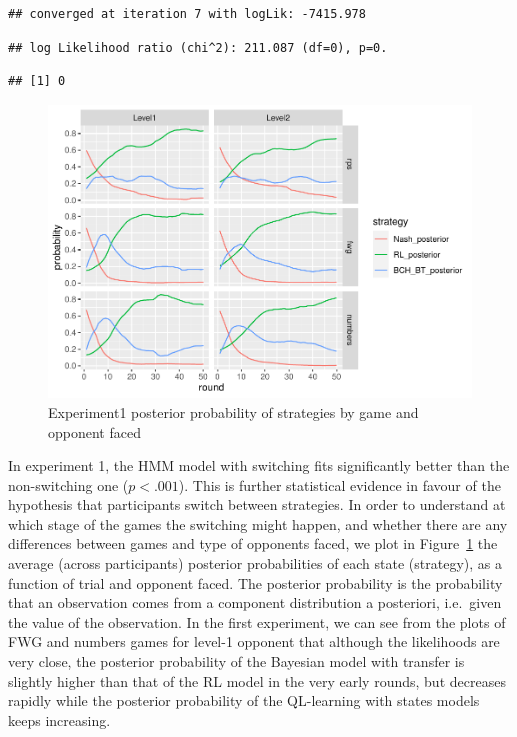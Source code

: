 \documentclass[man,floatsintext]{apa6}
\begin{document}
\begin{verbatim}
## converged at iteration 7 with logLik: -7415.978
\end{verbatim}

\begin{verbatim}
## log Likelihood ratio (chi^2): 211.087 (df=0), p=0.
\end{verbatim}

\begin{verbatim}
## [1] 0
\end{verbatim}

\begin{figure}

{\centering \includegraphics{paper_draft_2021_files/figure-latex/exp1-posteriors-plot-1} 

}

\caption{Experiment1 posterior probability of strategies by game and opponent faced}\label{fig:exp1-posteriors-plot}
\end{figure}

In experiment 1, the HMM model with switching fits significantly better than the non-switching one (\(p < .001\)). This is further statistical evidence in favour of the hypothesis that participants switch between strategies. In order to understand at which stage of the games the switching might happen, and whether there are any differences between games and type of opponents faced, we plot in Figure~\ref{fig:exp1-posteriors-plot} the average (across participants) posterior probabilities of each state (strategy), as a function of trial and opponent faced. The posterior probability is the probability that an observation comes from a component distribution a posteriori, i.e.~given the value of the observation. In the first experiment, we can see from the plots of FWG and numbers games for level-1 opponent that although the likelihoods are very close, the posterior probability of the Bayesian model with transfer is slightly higher than that of the RL model in the very early rounds, but decreases rapidly while the posterior probability of the QL-learning with states models keeps increasing.
\end{document}
